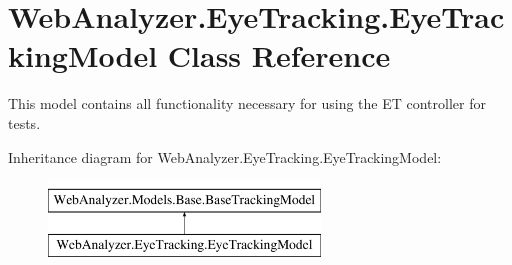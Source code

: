 \hypertarget{class_web_analyzer_1_1_eye_tracking_1_1_eye_tracking_model}{}\section{Web\+Analyzer.\+Eye\+Tracking.\+Eye\+Tracking\+Model Class Reference}
\label{class_web_analyzer_1_1_eye_tracking_1_1_eye_tracking_model}


This model contains all functionality necessary for using the E\+T controller for tests.  


Inheritance diagram for Web\+Analyzer.\+Eye\+Tracking.\+Eye\+Tracking\+Model\+:\begin{figure}[H]
\begin{center}
\leavevmode
\includegraphics[height=2.000000cm]{class_web_analyzer_1_1_eye_tracking_1_1_eye_tracking_model}
\end{center}
\end{figure}
